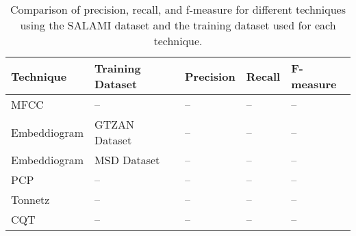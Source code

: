 
\begin{table}[h]
\centering
\begin{tabularx}{\textwidth}{|X|X|X|X|X|}
\hline
\textbf{Technique} & \textbf{Training Dataset} & \textbf{Precision} & \textbf{Recall} & \textbf{F-measure} \\
\hline
MFCC & -- & -- & -- & -- \\
\hline
Embeddiogram & GTZAN Dataset & -- & -- & -- \\
\hline
Embeddiogram & MSD Dataset & -- & -- & -- \\
\hline
PCP & -- & -- & -- & -- \\
\hline
Tonnetz & -- & -- & -- & -- \\
\hline
CQT & -- & -- & -- & -- \\
\hline
\end{tabularx}
\caption{Comparison of precision, recall, and f-measure for different techniques using the SALAMI dataset and the training dataset used for each technique.}
\label{tab:comparison}
\end{table}




